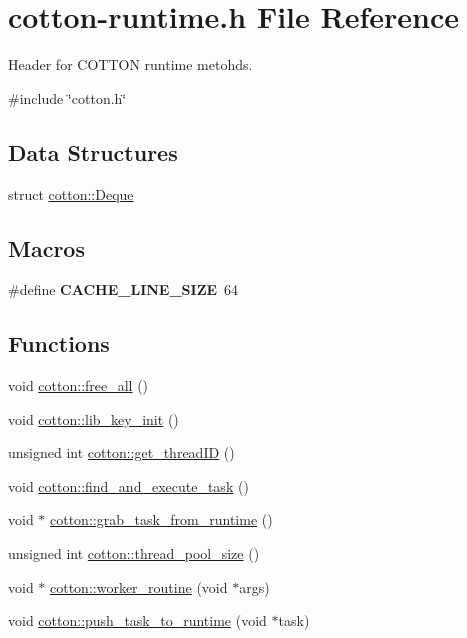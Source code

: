 \hypertarget{cotton-runtime_8h}{}\section{cotton-\/runtime.h File Reference}
\label{cotton-runtime_8h}


Header for C\+O\+T\+T\+ON runtime metohds.  


{\ttfamily \#include \char`\"{}cotton.\+h\char`\"{}}\newline
\subsection*{Data Structures}
\begin{DoxyCompactItemize}
\item 
struct \mbox{\hyperlink{structcotton_1_1Deque}{cotton\+::\+Deque}}
\end{DoxyCompactItemize}
\subsection*{Macros}
\begin{DoxyCompactItemize}
\item 
\mbox{\label{cotton-runtime_8h_af89f60b07247176687889ade776c8e10}} 
\#define {\bfseries C\+A\+C\+H\+E\+\_\+\+L\+I\+N\+E\+\_\+\+S\+I\+ZE}~64
\end{DoxyCompactItemize}
\subsection*{Functions}
\begin{DoxyCompactItemize}
\item 
void \mbox{\hyperlink{cotton-runtime_8h_ad169fe95f5f03bdfa569dd365dde6c12}{cotton\+::free\+\_\+all}} ()
\item 
void \mbox{\hyperlink{cotton-runtime_8h_a4ea9036584fa3bd86fe8626dc05d295f}{cotton\+::lib\+\_\+key\+\_\+init}} ()
\item 
unsigned int \mbox{\hyperlink{cotton-runtime_8h_ab1ebe1f6821a54e7c4911c22acebff8a}{cotton\+::get\+\_\+thread\+ID}} ()
\item 
void \mbox{\hyperlink{cotton-runtime_8h_af22caee9434a7e06a09b2f9a0417c1eb}{cotton\+::find\+\_\+and\+\_\+execute\+\_\+task}} ()
\item 
void $\ast$ \mbox{\hyperlink{cotton-runtime_8h_a1cae25b77bd884fcdcf2532663056d22}{cotton\+::grab\+\_\+task\+\_\+from\+\_\+runtime}} ()
\item 
unsigned int \mbox{\hyperlink{cotton-runtime_8h_a0b32dd3b6a3d126e107d5c77ec1f4cc3}{cotton\+::thread\+\_\+pool\+\_\+size}} ()
\item 
void $\ast$ \mbox{\hyperlink{cotton-runtime_8h_a361c34063ecb68cf02d417074decb12b}{cotton\+::worker\+\_\+routine}} (void $\ast$args)
\item 
void \mbox{\hyperlink{cotton-runtime_8h_a803285410d295a5f32238ad2dfc241a5}{cotton\+::push\+\_\+task\+\_\+to\+\_\+runtime}} (void $\ast$task)
\end{DoxyCompactItemize}

